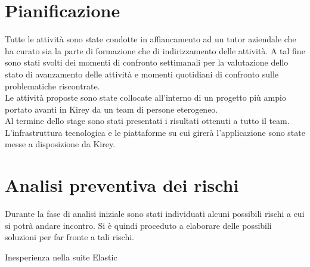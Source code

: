 \section{Pianificazione}
Tutte le attività sono state condotte in affiancamento ad un tutor aziendale che ha curato sia la parte di formazione che di indirizzamento delle attività.
A tal fine sono stati svolti dei momenti di confronto settimanali per la valutazione dello stato di avanzamento delle attività e momenti quotidiani di confronto sulle problematiche riscontrate. \\
Le attività proposte sono state collocate all'interno di un progetto più ampio portato avanti in Kirey da un team di persone eterogeneo. \\
Al termine dello stage sono stati presentati i risultati ottenuti a tutto il team.
L'infrastruttura tecnologica e le piattaforme su cui girerà l'applicazione sono state messe a disposizione da Kirey.


\section{Analisi preventiva dei rischi}

Durante la fase di analisi iniziale sono stati individuati alcuni possibili rischi a cui si potrà andare incontro.
Si è quindi proceduto a elaborare delle possibili soluzioni per far fronte a tali rischi.\\

\begin{risk}{Inesperienza nella suite Elastic}
    \vspace{0.5em}
    \vspace{0.5em}
    \vspace{0.5em}
    \vspace{0.5em}
    \label{risk:elastic-inexperience}
\end{risk}

\vspace{1em}

